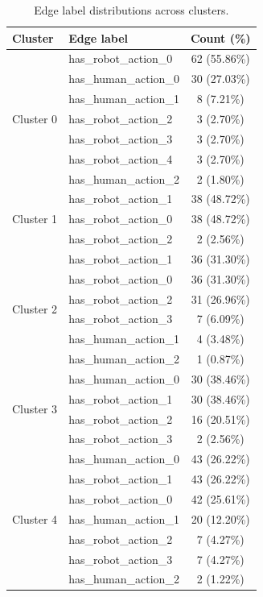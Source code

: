 \documentclass[letterpaper]{article} %
\begin{document}
\begin{table}[tb]
    \centering
    \renewcommand{\arraystretch}{1.2}
    \setlength{\tabcolsep}{8pt}
    \begin{tabular}{llc}
        \toprule
        \textbf{Cluster} & \textbf{Edge label} & \textbf{Count (\%)} \\
        \midrule
        \multirow{7}{*}{Cluster 0} 
        & has\_robot\_action\_0 & 62 (55.86\%) \\
        & has\_human\_action\_0 & 30 (27.03\%) \\
        & has\_human\_action\_1 & 8 (7.21\%) \\
        & has\_robot\_action\_2 & 3 (2.70\%) \\
        & has\_robot\_action\_3 & 3 (2.70\%) \\
        & has\_robot\_action\_4 & 3 (2.70\%) \\
        & has\_human\_action\_2 & 2 (1.80\%) \\
        \midrule
        \multirow{3}{*}{Cluster 1} 
        & has\_robot\_action\_1 & 38 (48.72\%) \\
        & has\_robot\_action\_0 & 38 (48.72\%) \\
        & has\_robot\_action\_2 & 2 (2.56\%) \\
        \midrule
        \multirow{6}{*}{Cluster 2} 
        & has\_robot\_action\_1 & 36 (31.30\%) \\
        & has\_robot\_action\_0 & 36 (31.30\%) \\
        & has\_robot\_action\_2 & 31 (26.96\%) \\
        & has\_robot\_action\_3 & 7 (6.09\%) \\
        & has\_human\_action\_1 & 4 (3.48\%) \\
        & has\_human\_action\_2 & 1 (0.87\%) \\
        \midrule
        \multirow{4}{*}{Cluster 3} 
        & has\_human\_action\_0 & 30 (38.46\%) \\
        & has\_robot\_action\_1 & 30 (38.46\%) \\
        & has\_robot\_action\_2 & 16 (20.51\%) \\
        & has\_robot\_action\_3 & 2 (2.56\%) \\
        \midrule
        \multirow{7}{*}{Cluster 4} 
        & has\_human\_action\_0 & 43 (26.22\%) \\
        & has\_robot\_action\_1 & 43 (26.22\%) \\
        & has\_robot\_action\_0 & 42 (25.61\%) \\
        & has\_human\_action\_1 & 20 (12.20\%) \\
        & has\_robot\_action\_2 & 7 (4.27\%) \\
        & has\_robot\_action\_3 & 7 (4.27\%) \\
        & has\_human\_action\_2 & 2 (1.22\%) \\
        \bottomrule
    \end{tabular}
    \caption{Edge label distributions across clusters.}
    \label{tab:cluster_edges}
\end{table}
\end{document}
